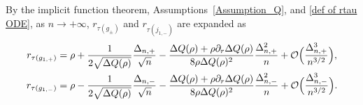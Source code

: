 \documentclass[reqno]{amsart}
\newcommand{\1}{\mathds{1}}
\numberwithin{equation}{section}
\theoremstyle{definition}
\begin{document}
By the implicit function theorem, Assumptions~\ref{Assumption_Q}, and \eqref{def of rtau ODE}, as $n\to+\infty$, $r_{\tau(g_{\pm})}$ and $r_{\tau(j_{1,-})}$ are expanded as  
\begin{align}
\label{def of rtau g1plus}
    r_{\tau(g_{1,+})}
&=
\rho+\frac{1}{2\sqrt{\Delta Q(\rho)}}\frac{\Delta_{n,+}}{\sqrt{n}}
-\frac{\Delta Q(\rho)+\rho\partial_r\Delta Q(\rho)}{8\rho \Delta Q(\rho)^2}\frac{\Delta_{n,+}^2}{n}+\mathcal{O}\Bigl(\frac{\Delta_{n,+}^3}{n^{3/2}}\Bigr), 
\\
\label{def of rtau g1minus}
r_{\tau(g_{1,-})}
&=\rho-\frac{1}{2\sqrt{\Delta Q(\rho)}}\frac{\Delta_{n,-}}{\sqrt{n}}
-\frac{\Delta Q(\rho)+\rho\partial_r\Delta Q(\rho)}{8\rho \Delta Q(\rho)^2}\frac{\Delta_{n,-}^2}{n}+\mathcal{O}\Bigl(\frac{\Delta_{n,-}^3}{n^{3/2}}\Bigr).
\end{align}
\end{document}
